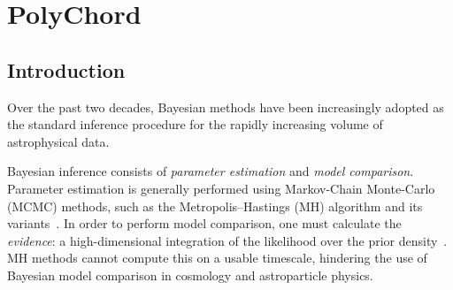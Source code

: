 \newcommand{\smin}{\mathrm{min}}         %
\newcommand{\smax}{\mathrm{max}}         %
\newcommand{\slive}{\mathrm{live}}       %
\newcommand{\sdead}{\mathrm{dead}}       %
\newcommand{\sphantom}{\mathrm{phantom}} %
\newcommand{\sprocs}{\mathrm{procs}}     %
\newcommand{\sdims}{\mathrm{dims}}       %
\newcommand{\srepeats}{\mathrm{repeats}} %
\newcommand{\sshell}{\mathrm{shell}} %

\newcommand{\nlive}{n_\slive}       %
\newcommand{\nphantom}{n_\sphantom} %
\newcommand{\ndims}{n_\sdims}       %
\newcommand{\nprocs}{n_\sprocs}     %
\newcommand{\nlike}{N_\lik}         %
\newcommand{\nrepeats}{n_\srepeats} %

\newcommand{\nhatx}{\mathbf{\hat{n}}}        %
\newcommand{\nhat}[1]{\nhatx_{#1}} %
\newcommand{\bxx}{\mathbf{x}}                %
\newcommand{\bmew}{\mathbf{\mu}}                %
\newcommand{\bzero}{\mathbf{0}}                %
\newcommand{\byy}{\mathbf{y}}                %
\newcommand{\bFF}{\mathbf{F}}                %
\newcommand{\bx}[1]{\bxx_{#1}}         %



\chapter{PolyChord}
\label{chap:pc}

\section{Introduction}
\label{sec:pc:introduction}
Over the past two decades, Bayesian methods have been increasingly adopted as the standard inference procedure for the rapidly increasing volume of astrophysical data.

Bayesian inference consists of {\em parameter estimation\/} and {\em model comparison}.  Parameter estimation is generally performed using Markov-Chain Monte-Carlo (MCMC) methods, such as the Metropolis--Hastings (MH) algorithm and its variants~\citep{Mackay}.  In order to perform model comparison, one must calculate the {\em evidence\/}: a high-dimensional integration of the likelihood over the prior density~\citep{Sivia}.  MH methods cannot compute this on a usable timescale, hindering the use of Bayesian model comparison in cosmology and astroparticle physics.

